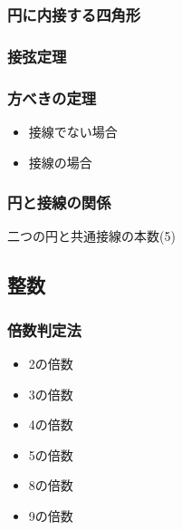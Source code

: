 \documentclass[10pt,dvipdfmx]{jsarticle}
\begin{document}
\begin{multicols}{2}
  \begin{minipage}{0.5\textwidth}
    \subsubsection*{円に内接する四角形}
  \end{minipage}
  \begin{minipage}{0.5\textwidth}
    \subsubsection*{接弦定理}
  \end{minipage}
\end{multicols}

\subsubsection*{方べきの定理}
\begin{multicols}{2}
  \begin{itemize}
    \item 接線でない場合\vspace{60mm}
    \item 接線の場合\vspace{60mm}
  \end{itemize}
\end{multicols}

\subsubsection*{円と接線の関係}
二つの円と共通接線の本数(5)
\vspace{10cm}


\subsection*{整数}
\subsubsection*{倍数判定法}
\begin{multicols}{2}
  \begin{itemize}
    \item 2の倍数
    \item 3の倍数
    \item 4の倍数
    \item 5の倍数
    \item 8の倍数
    \item 9の倍数
  \end{itemize}
\end{multicols}
\end{document}
